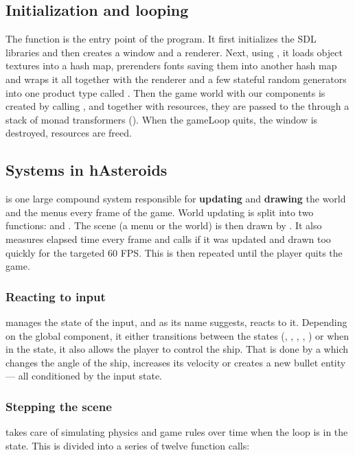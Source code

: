\documentclass[
  digital, %
  color,   %
  table,   %
  oneside, %
  lof,     %
  lot,     %
]{fithesis3}
\begin{document}
\subsection{Initialization and looping}
\label{sect:initialization}
The  function is the entry point of the program. It first initializes
the SDL libraries and then creates a window and a renderer. Next, using ,
it loads object textures into a hash map, prerenders fonts saving them into another
hash map and wraps it all together with the renderer and a few stateful random generators
into one product type called . Then the game world with our
components is created by calling , and together with resources,
they are passed to the  through a stack
of monad transformers (). When the gameLoop quits,
the window is destroyed, resources are freed.


\subsection{Systems in hAsteroids}

 is one large compound system responsible for \textbf{updating} and \textbf{drawing}
the world and the menus every frame of the game. World updating is split
into two functions:  and .
The scene (a menu or the world) is then drawn by .
It also measures elapsed time every frame and calls  if it was
updated and drawn too quickly for the targeted 60 FPS.
This is then repeated until the player quits the game.

\subsubsection{\textbf{Reacting to input}}
 manages the state of the input, and as its name suggests,
reacts to it. Depending on the global  component,
it either transitions between the states (, ,
, , ) or
when in the  state, it also allows the player to control the ship.
That is done by a  which changes the angle of the ship,
increases its velocity or creates a new bullet entity --- all conditioned by the input state.

\subsubsection{\textbf{Stepping the scene}}
 takes care of simulating physics and game rules
over time when the loop is in the  state.
This is divided into a series of twelve function calls:
\end{document}
